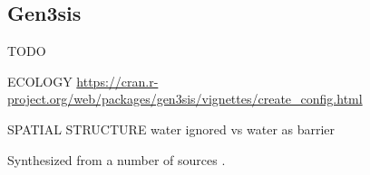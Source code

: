 









\subsection{Gen3sis}

TODO \citep{hagen2021gen3sis}

ECOLOGY \url{https://cran.r-project.org/web/packages/gen3sis/vignettes/create_config.html}

SPATIAL STRUCTURE
water ignored vs water as barrier

Synthesized from a number of sources \citep{straume2020global,westerhold2020astronomically,fick2017worldclim,hagen2019mountain,annan2013new,cramwinckel2018synchronous,evans2018eocene,hollis2019deepmip,hutchinson2018climate,keating2011warm,sijp2014role,zhang2019evolution}.


